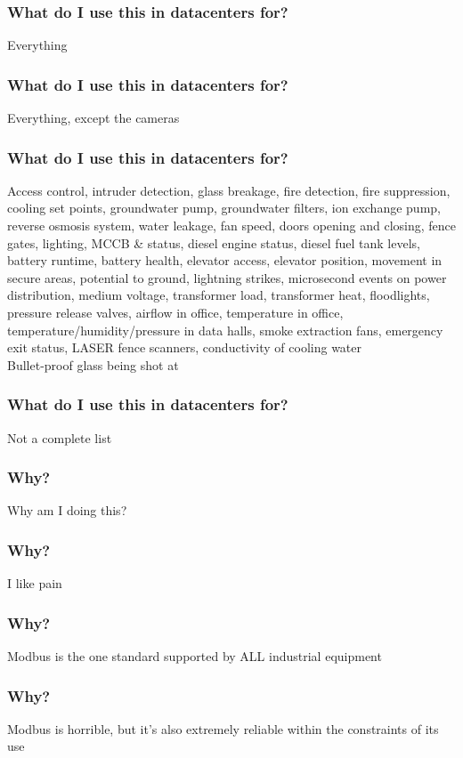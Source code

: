 \documentclass[aspectratio=169]{beamer}
\begin{document}
\begin{frame}
	\frametitle{What do I use this in datacenters for?}
	\centering
	\vfill
	Everything
	\vfill
\end{frame}

\begin{frame}
	\frametitle{What do I use this in datacenters for?}
	\centering
	\vfill
	Everything, except the cameras
	\vfill
\end{frame}


\begin{frame}
	\frametitle{What do I use this in datacenters for?}
	\centering
	\vfill
	Access control, intruder detection, glass breakage, fire detection, fire suppression, cooling set points, groundwater pump, groundwater filters, ion exchange pump, reverse osmosis system, water leakage, fan speed, doors opening and closing, fence gates, lighting, MCCB \& status, diesel engine status, diesel fuel tank levels, battery runtime, battery health, elevator access, elevator position, movement in secure areas, potential to ground, lightning strikes, microsecond events on power distribution, medium voltage, transformer load, transformer heat, floodlights, pressure release valves, airflow in office, temperature in office, temperature/humidity/pressure in data halls, smoke extraction fans, emergency exit status, LASER fence scanners, conductivity of cooling water\\
	Bullet-proof glass being shot at
	\vfill
\end{frame}

\begin{frame}
	\frametitle{What do I use this in datacenters for?}
	\centering
	\vfill
	Not a complete list
	\vfill
\end{frame}

\begin{frame}
	\frametitle{Why?}
	\centering
	\vfill
	Why am I doing this?
	\vfill
\end{frame}

\begin{frame}
	\frametitle{Why?}
	\centering
	\vfill
	I like pain
	\vfill
\end{frame}

\begin{frame}
	\frametitle{Why?}
	\centering
	\vfill
	Modbus is the one standard supported by ALL industrial equipment
	\vfill
\end{frame}

\begin{frame}
	\frametitle{Why?}
	\centering
	\vfill
	Modbus is horrible, but it's also extremely reliable within the constraints of its use
	\vfill
\end{frame}
\end{document}
